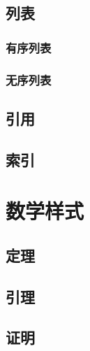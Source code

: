 \subsection{列表}
    \subsubsection{有序列表}
    \subsubsection{无序列表}
\subsection{引用}
\subsection{索引}
\clearpage
\section[数学样式]{数学样式}
\subsection{定理}
\subsection{引理}
\subsection{证明}
